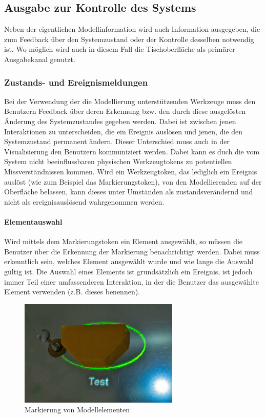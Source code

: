 \subsection{Ausgabe zur Kontrolle des Systems} %
\label{sub:ausgabe_zur_kontrolle_des_systems}

Neben der eigentlichen Modellinformation wird auch Information ausgegeben, die zum Feedback über den Systemzustand oder der Kontrolle desselben notwendig ist. Wo möglich wird auch in diesem Fall die Tischoberfläche als primärer Ausgabekanal genutzt.

\subsubsection{Zustands- und Ereignismeldungen} %
\label{ssub:zustands_und_ereignismeldungen}

Bei der Verwendung der die Modellierung unterstützenden Werkzeuge muss den Benutzern Feedback über deren Erkennung bzw. den durch diese ausgelösten Änderung des Systemzustandes gegeben werden. Dabei ist zwischen jenen Interaktionen zu unterscheiden, die ein Ereignis auslösen und jenen, die den Systemzustand permanent ändern. Dieser Unterschied muss auch in der Visualisierung den Benutzern kommuniziert werden. Dabei kann es duch die vom System nicht beeinflussbaren physischen Werkzeugtokens zu potentiellen Missverständnissen kommen. Wird ein Werkzeugtoken, das lediglich ein Ereignis auslöst (wie zum Beispiel das Markierungstoken), von den Modellierenden auf der Oberfläche belassen, kann dieses unter Umständen als zustandsverändernd und nicht als ereignisauslösend wahrgenommen werden. 

\paragraph{Elementauswahl}

Wird mittels dem Markierungstoken ein Element ausgewählt, so müssen die Benutzer über die Erkennung der Markierung benachrichtigt werden. Dabei muss erkenntlich sein, welches Element ausgewählt wurde und wie lange die Auswahl gültig ist. Die Auswahl eines Elements ist grundsätzlich ein Ereignis, ist jedoch immer Teil einer umfassenderen Interaktion, in der die Benutzer das ausgewählte Element verwenden (z.B. dieses benennen).

\begin{figure}[htbp]
	\centering
		\includegraphics[height=2in]{img/SystemNeu/MarkierungTisch.jpg}
	\caption{Markierung von Modellelementen}
	\label{fig:img_SystemNeu_MarkierungTisch}
\end{figure}

